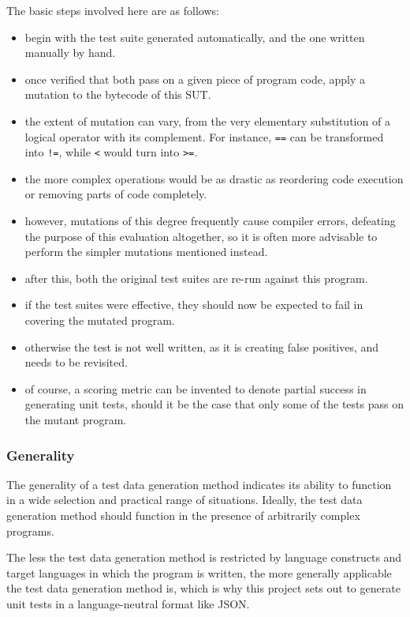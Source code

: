 \documentclass{icldt}
\numberwithin{equation}{section}       %
\begin{document}
{The basic steps involved here are as follows:
\begin{itemize}
	\item begin with the test suite generated automatically, and the one written manually by hand.
	\item once verified that both pass on a given piece of program code, apply a mutation to the bytecode of this SUT.
	\item the extent of mutation can vary, from the very elementary substitution of a logical operator with its complement. For instance, \texttt{==} can be transformed into \texttt{!=}, while \texttt{<} would turn into \texttt{>=}.
	\item the more complex operations would be as drastic as reordering code execution or removing parts of code completely.
	\item however, mutations of this degree frequently cause compiler errors, defeating the purpose of this evaluation altogether, so it is often more advisable to perform the simpler mutations mentioned instead.
	\item after this, both the original test suites are re-run against this program.
	\item if the test suites were effective, they should now be expected to fail in covering the mutated program.
	\item otherwise the test is not well written, as it is creating false positives, and needs to be revisited.
	\item of course, a scoring metric can be invented to denote partial success in generating unit tests, should it be the case that only some of the tests pass on the mutant program.
\end{itemize}

\subsubsection{Generality}
The generality of a test data generation method indicates its ability to function in a wide selection and practical range of situations. Ideally, the test data generation method should function in the presence of arbitrarily complex programs.

The less the test data generation method is restricted by language constructs and target languages in which the program is written, the more generally applicable the test data generation method is, which is why this project sets out to generate unit tests in a language-neutral format like JSON.

}
\end{document}
